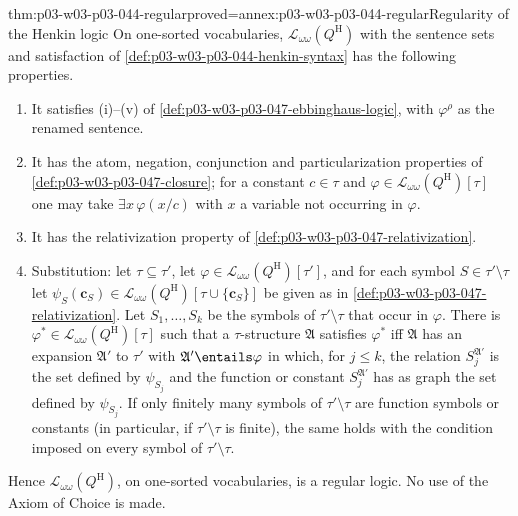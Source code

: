 \begin{hbtheorem}{thm:p03-w03-p03-044-regular}{proved=annex:p03-w03-p03-044-regular}{Regularity of the Henkin logic}
On one-sorted vocabularies, \(\mathscr L_{\omega\omega}(Q^{\mathrm H})\)
with the sentence sets and satisfaction of
\cref{def:p03-w03-p03-044-henkin-syntax} has the following properties.
\begin{enumerate}
 \item It satisfies (i)--(v) of \cref{def:p03-w03-p03-047-ebbinghaus-logic},
       with \(\varphi^\rho\) as the renamed sentence.
 \item It has the atom, negation, conjunction and particularization
       properties of \cref{def:p03-w03-p03-047-closure}; for a constant
       \(c\in\tau\) and \(\varphi\in\mathscr L_{\omega\omega}(Q^{\mathrm
       H})[\tau]\) one may take \(\exists x\,\varphi(x/c)\) with \(x\) a
       variable not occurring in \(\varphi\).
 \item It has the relativization property of
       \cref{def:p03-w03-p03-047-relativization}.
 \item Substitution: let \(\tau\subseteq\tau'\), let
       \(\varphi\in\mathscr L_{\omega\omega}(Q^{\mathrm H})[\tau']\), and for
       each symbol \(S\in\tau'\setminus\tau\) let
       \(\psi_S(\mathbf c_S)\in\mathscr L_{\omega\omega}(Q^{\mathrm
       H})[\tau\cup\{\mathbf c_S\}]\) be given as in
       \cref{def:p03-w03-p03-047-relativization}.  Let \(S_1,\ldots,S_k\) be
       the symbols of \(\tau'\setminus\tau\) that occur in \(\varphi\).  There
       is \(\varphi^\ast\in\mathscr L_{\omega\omega}(Q^{\mathrm H})[\tau]\)
       such that a \(\tau\)-structure \(\mathfrak A\) satisfies
       \(\varphi^\ast\) iff \(\mathfrak A\) has an expansion \(\mathfrak A'\)
       to \(\tau'\) with \(\mathfrak A'\entails\varphi\) in which, for
       \(j\le k\), the relation \(S_j^{\mathfrak A'}\) is the set defined by
       \(\psi_{S_j}\) and the function or constant \(S_j^{\mathfrak A'}\) has
       as graph the set defined by \(\psi_{S_j}\).  If only
       finitely many symbols of \(\tau'\setminus\tau\) are function symbols
       or constants (in particular, if \(\tau'\setminus\tau\) is finite), the
       same holds with the condition imposed on every symbol of
       \(\tau'\setminus\tau\).
\end{enumerate}
Hence \(\mathscr L_{\omega\omega}(Q^{\mathrm H})\), on one-sorted
vocabularies, is a regular logic.  No use of the Axiom of Choice is made.
\end{hbtheorem}

